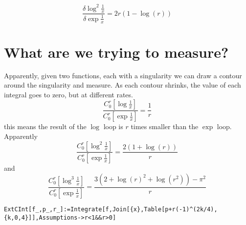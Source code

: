 \documentclass{article}
\begin{document}
$$
\frac{\delta \log^2 \frac{1}{x} }{\delta \exp \frac{1}{x}} = 2r(1-\log(r))
$$

\section{What are we trying to measure?}
Apparently, given two functions, each with a singularity we can draw a contour around the singularity and measure. As each contour shrinks, the value of each integral goes to zero, but at different rates. 
$$
\frac{C_0^r[\log \frac{1}{x}]}{C_0^r[\exp \frac{1}{x}]} = \frac{1}{r}
$$
this means the result of the $\log$ loop is $r$ times smaller than the $\exp$ loop. Apparently
$$
\frac{C_0^r[\log^2 \frac{1}{x}]}{C_0^r[\exp \frac{1}{x}]} = \frac{2(1+\log(r))}{r}
$$
and
$$
\frac{C_0^r[\log^3 \frac{1}{x}]}{C_0^r[\exp \frac{1}{x}]} = \frac{3(2+\log(r)^2 + \log(r^2)) - \pi^2}{r}
$$

\begin{verbatim}
ExtCInt[f_,p_,r_]:=Integrate[f,Join[{x},Table[p+r(-1)^(2k/4),{k,0,4}]],Assumptions->r<1&&r>0]
\end{verbatim}
\end{document}
